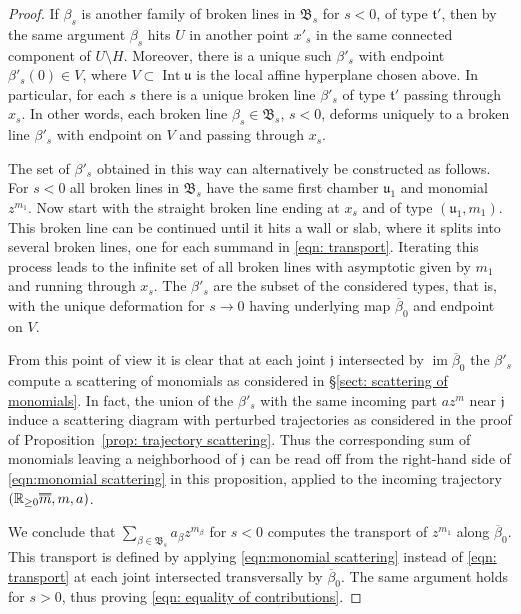 \documentclass[11pt,letter]{amsart}
\theoremstyle{definition}
\theoremstyle{remark}
\numberwithin{equation}{section}
\numberwithin{figure}{section}
\newcommand{\doublebar}[1]{\shortstack{$\overline{\hphantom{#1}}
	$\\[-4pt] $\overline{#1}$}}
\newcommand{\RR} {\mathbb{R}}
\newcommand {\foB}  {\mathfrak{B}}
\newcommand {\foj}  {\mathfrak{j}}
\newcommand {\fot}  {\mathfrak{t}}
\newcommand {\fou}  {\mathfrak{u}}
\newcommand {\im}  {\operatorname{im}}
\newcommand {\Int}  {\operatorname{Int}}
\begin{document}
\begin{proof}
If $\beta_s$ is another family of broken lines in $\foB_s$ for $s<0$, of type
$\fot'$, then by the same argument $\beta_s$ hits $U$ in another point $x'_s$ in
the same connected component of $U\setminus H$. Moreover, there is a unique such
$\beta'_s$ with endpoint $\beta'_s(0)\in V$, where $V\subset\Int \fou$ is the
local affine hyperplane chosen above. In particular, for each $s$ there is a
unique broken line $\beta'_s$ of type $\fot'$ passing through $x_s$. In other
words, each broken line $\beta_s\in\foB_s$, $s<0$, deforms uniquely to a broken
line $\beta'_s$ with endpoint on $V$ and passing through $x_s$.

The set of $\beta'_s$ obtained in this way can alternatively be constructed as
follows. For $s<0$ all broken lines in $\foB_s$ have the same first chamber
$\fou_1$ and monomial $z^{m_1}$. Now start with the straight broken line ending
at $x_s$ and of type $(\fou_1,m_1)$. This broken line can be continued until it
hits a wall or slab, where it splits into several broken lines, one for each
summand in \eqref{eqn: transport}. Iterating this process leads to the infinite
set of all broken lines with asymptotic given by $m_1$ and running through
$x_s$. The $\beta'_s$ are the subset of the considered types, that is, with the
unique deformation for $s\to 0$ having underlying map $\overline\beta_0$ and
endpoint on $V$.

From this point of view it is clear that at each joint $\foj$ intersected by
$\im\overline \beta_0$ the $\beta'_s$ compute a scattering of monomials as
considered in \S\ref{sect: scattering of monomials}. In fact, the union of the
$\beta'_s$ with the same incoming part $az^m$ near $\foj$ induce a scattering
diagram with perturbed trajectories as considered in the proof of
Proposition~\ref{prop: trajectory scattering}. Thus the corresponding sum of
monomials leaving a neighborhood of $\foj$ can be read off from the right-hand
side of \eqref{eqn:monomial scattering} in this proposition, applied to the
incoming trajectory $(\RR_{\ge0}\doublebar m,m,a)$.

We conclude that $\sum_{\beta\in\foB_s} a_\beta z^{m_\beta}$ for $s<0$ computes
the transport of $z^{m_1}$ along $\overline \beta_0$. This transport is defined
by applying \eqref{eqn:monomial scattering} instead of \eqref{eqn: transport} at
each joint intersected transversally by $\overline\beta_0$. The same argument holds for $s>0$,
thus proving \eqref{eqn: equality of contributions}.
\end{proof}
\end{document}
